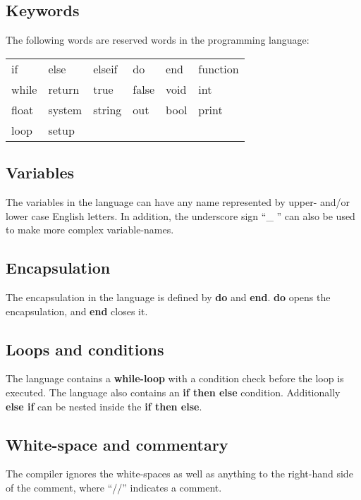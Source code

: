 \subsection{Keywords}
The following words are reserved words in the programming language:\\ 
\begin{center}
\begin{tabular}{ l l l l l l}
if & else & elseif & do & end & function \\
while & return & true & false & void & int \\
float & system & string & out & bool & print\\
loop & setup \\
\end{tabular}
\end{center}

\subsection{Variables}
The variables in the language can have any name represented by upper- and/or lower case English letters. In addition, the underscore sign ``\_ '' can also be used to make more complex variable-names. 

\subsection{Encapsulation}
The encapsulation in the language is defined by \textbf{do} and \textbf{end}. \textbf{do} opens the encapsulation, and \textbf{end} closes it.   

\subsection{Loops and conditions}
The language contains a \textbf{while-loop} with a condition check before the loop is executed. The language also contains an \textbf{if then else} condition. Additionally \textbf{else if} can be nested inside the \textbf{if then else}.   

\subsection{White-space and commentary}
The compiler ignores the white-spaces as well as anything to the right-hand side of the comment, where ``//'' indicates a comment.


